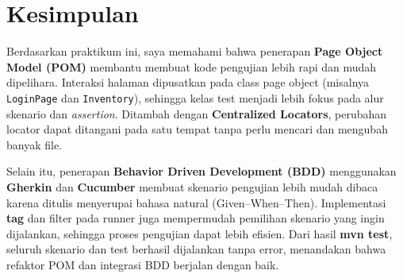 \documentclass[a4paper,oneside,11pt]{book}
\begin{document}
\section{Kesimpulan}

\par Berdasarkan praktikum ini, saya memahami bahwa penerapan \textbf{Page Object Model (POM)} membantu membuat kode pengujian lebih rapi dan mudah dipelihara. Interaksi halaman dipusatkan pada class page object (misalnya \texttt{LoginPage} dan \texttt{Inventory}), sehingga kelas test menjadi lebih fokus pada alur skenario dan \textit{assertion}. Ditambah dengan \textbf{Centralized Locators}, perubahan locator dapat ditangani pada satu tempat tanpa perlu mencari dan mengubah banyak file.

\par Selain itu, penerapan \textbf{Behavior Driven Development (BDD)} menggunakan \textbf{Gherkin} dan \textbf{Cucumber} membuat skenario pengujian lebih mudah dibaca karena ditulis menyerupai bahasa natural (Given--When--Then). Implementasi \textbf{tag} dan filter pada runner juga mempermudah pemilihan skenario yang ingin dijalankan, sehingga proses pengujian dapat lebih efisien. Dari hasil \textbf{mvn test}, seluruh skenario dan test berhasil dijalankan tanpa error, menandakan bahwa refaktor POM dan integrasi BDD berjalan dengan baik.
\end{document}
